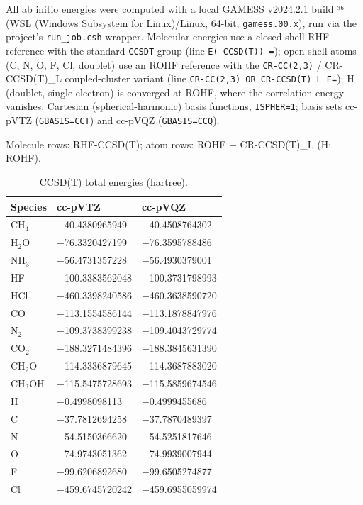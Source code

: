 \documentclass[preprint,12pt]{elsarticle}
\begin{document}
All ab initio energies were computed with a local GAMESS v2024.2.1 build ³⁶ (WSL (Windows Subsystem for Linux)/Linux, 64-bit, \texttt{gamess.00.x}), run via the project's \texttt{run\_job.csh} wrapper. Molecular energies use a closed-shell RHF reference with the standard \texttt{CCSDT} group (line \texttt{E(   CCSD(T)) =}); open-shell atoms (C, N, O, F, Cl, doublet) use an ROHF reference with the \texttt{CR-CC(2,3)} / CR-CCSD(T)\_L coupled-cluster variant (line \texttt{CR-CC(2,3) OR CR-CCSD(T)\_L E=}); H (doublet, single electron) is converged at ROHF, where the correlation energy vanishes. Cartesian (spherical-harmonic) basis functions, \texttt{ISPHER=1}; basis sets cc-pVTZ (\texttt{GBASIS=CCT}) and cc-pVQZ (\texttt{GBASIS=CCQ}).

Molecule rows: RHF-CCSD(T); atom rows: ROHF + CR-CCSD(T)\_L (H: ROHF).

\begin{table}[htbp]
\centering
\caption{CCSD(T) total energies (hartree).}
\label{tab:CCSDTtotalenergi}
\begin{tabular}{lll}
\hline
\textbf{Species} & \textbf{cc-pVTZ} & \textbf{cc-pVQZ} \\
\hline
CH$_{4}$ & $-$40.4380965949 & $-$40.4508764302 \\
H$_{2}$O & $-$76.3320427199 & $-$76.3595788486 \\
NH$_{3}$ & $-$56.4731357228 & $-$56.4930379001 \\
HF & $-$100.3383562048 & $-$100.3731798993 \\
HCl & $-$460.3398240586 & $-$460.3638590720 \\
CO & $-$113.1554586144 & $-$113.1878847976 \\
N$_{2}$ & $-$109.3738399238 & $-$109.4043729774 \\
CO$_{2}$ & $-$188.3271484396 & $-$188.3845631390 \\
CH$_{2}$O & $-$114.3336879645 & $-$114.3687883020 \\
CH$_{3}$OH & $-$115.5475728693 & $-$115.5859674546 \\
H & $-$0.4998098113 & $-$0.4999455686 \\
C & $-$37.7812694258 & $-$37.7870489397 \\
N & $-$54.5150366620 & $-$54.5251817646 \\
O & $-$74.9743051362 & $-$74.9939007944 \\
F & $-$99.6206892680 & $-$99.6505274877 \\
Cl & $-$459.6745720242 & $-$459.6955059974 \\
\hline
\end{tabular}
\end{table}
\end{document}
